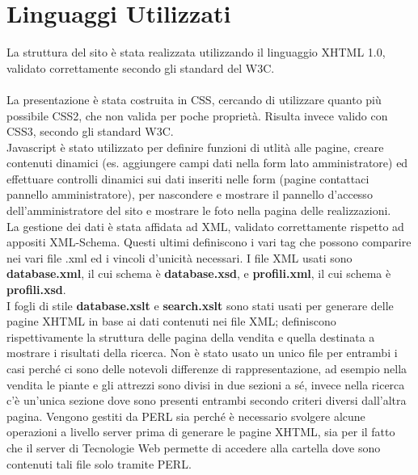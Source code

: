 \section{Linguaggi Utilizzati}{
	La struttura del sito è stata realizzata utilizzando il linguaggio XHTML 1.0, validato correttamente secondo gli standard del W3C. \\
	\\
	La presentazione è stata costruita in CSS, cercando di utilizzare quanto più possibile CSS2, che non valida per poche proprietà. Risulta invece valido con CSS3, secondo gli standard W3C.
	\\
	Javascript è stato utilizzato per definire funzioni di utlità alle pagine, creare contenuti dinamici (es. aggiungere campi dati nella form lato amministratore) ed effettuare controlli dinamici sui dati inseriti nelle form (pagine contattaci pannello amministratore), per nascondere e mostrare il pannello d'accesso dell'amministratore del sito e mostrare le foto nella pagina delle realizzazioni.
	\\
	La gestione dei dati è stata affidata ad XML, validato correttamente rispetto ad appositi XML-Schema. Questi ultimi definiscono i vari tag che possono comparire nei vari file .xml ed i vincoli d'unicità necessari. I file XML usati sono \textbf{database.xml}, il cui schema è \textbf{database.xsd}, e \textbf{profili.xml}, il cui schema è \textbf{profili.xsd}.\\
	I fogli di stile \textbf{database.xslt} e \textbf{search.xslt} sono stati usati per generare delle pagine XHTML in base ai dati contenuti nei file XML; definiscono rispettivamente la struttura delle pagina della vendita e quella destinata a mostrare i risultati della ricerca. Non è stato usato un unico file per entrambi i casi perché ci sono delle notevoli differenze di rappresentazione, ad esempio nella vendita le piante e gli attrezzi sono divisi in due sezioni a sé, invece nella ricerca c'è un'unica sezione dove sono presenti entrambi secondo criteri diversi dall'altra pagina.
	Vengono gestiti da PERL sia perché è necessario svolgere alcune operazioni a livello server prima di generare le pagine XHTML, sia per il fatto che il server di Tecnologie Web permette di accedere alla cartella dove sono contenuti tali file solo tramite PERL.
	\\
}
